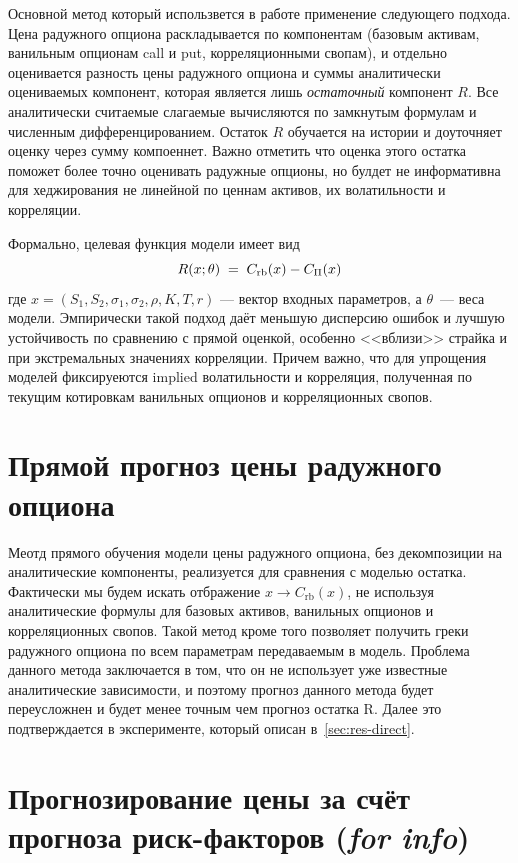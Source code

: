 Основной метод который использвется в работе применение следующего подхода. Цена радужного опциона
раскладывается по компонентам (базовым активам, ванильным опционам call и put, корреляционными свопам),
 и отдельно оценивается разность цены радужного опциона и суммы аналитически оцениваемых компонент, которая является
лишь \emph{остаточный} компонент $R$. Все аналитически считаемые
слагаемые вычисляются по замкнутым формулам и численным дифференцированием. Остаток $R$ обучается на истории и доуточняет оценку 
через сумму компоеннет. Важно отметить что оценка этого остатка поможет более точно оценивать радужные опционы, но булдет не информативна 
для хеджирования не линейной по ценнам активов, их волатильности и корреляции.

Формально, целевая функция модели имеет вид
\begin{equation}
  R(x;\theta)
  \;=\; C_{\text{rb}}(x) - C_{\Pi}(x) \\
\end{equation}
где $x = (S_{1},S_{2},\sigma_1,\sigma_2,\rho,K,T,r)$ --- вектор
входных параметров, а $\theta$~--- веса модели. Эмпирически такой
подход даёт меньшую дисперсию ошибок и лучшую устойчивость по сравнению
с прямой оценкой, особенно <<вблизи>> страйка и при экстремальных
значениях корреляции. Причем важно, что для упрощения моделей фиксируеются implied волатильности и корреляция, 
полученная по текущим котировкам ванильных опционов и корреляционных свопов.

\section{Прямой прогноз цены радужного опциона}
Меотд прямого обучения модели цены радужного опциона, без декомпозиции на аналитические компоненты, реализуется для сравнения с моделью остатка.
Фактически мы будем искать отбражение $x \to C_{\text{rb}}(x)$, не используя аналитические формулы для базовых активов, ванильных опционов и корреляционных свопов.
Такой метод кроме того позволяет получить греки радужного опциона по всем параметрам передаваемым в модель. Проблема данного метода заключается в том, что он не использует уже 
известные аналитические зависимости, и поэтому прогноз данного метода будет переусложнен и будет менее точным 
чем прогноз остатка R. Далее это подтверждается в эксперименте, который описан в~\cref{sec:res-direct}. 

\section{Прогнозирование цены за счёт прогноза риск-факторов
         \texorpdfstring{(\emph{for info})}{(for info)}}
\label{sec:ml-forecast}


